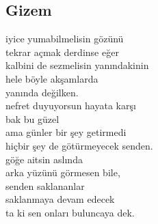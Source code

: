 \subsection{Gizem}

iyice yumabilmelisin gözünü \\
tekrar açmak derdinse eğer \\
kalbini de sezmelisin yanındakinin \\
hele böyle akşamlarda \\
yanında değilken. \\

\noindent\newline
nefret duyuyorsun hayata karşı \\
bak bu güzel \\
ama günler bir şey getirmedi \\
hiçbir şey de götürmeyecek senden. \\

\noindent\newline
göğe aitsin aslında \\
arka yüzünü görmesen bile, \\
senden saklananlar \\
saklanmaya devam edecek \\
ta ki sen onları buluncaya dek. \\